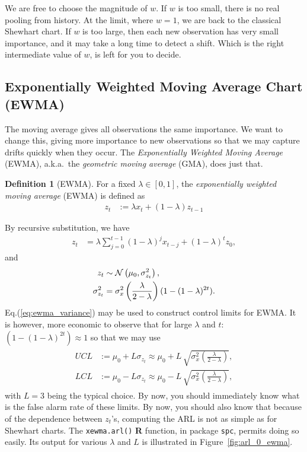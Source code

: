 \documentclass[12pt,a4paper]{report}
\theoremstyle{plain}
\theoremstyle{definition}
\newtheorem{definition}{Definition}
\newcommand{\R}{\textnormal{\sffamily\bfseries R }}
\newcommand{\aka}{{a.k.a.\ }}
\newcommand{\rcode}[1]{\texttt{#1}}
\newcommand{\arm}{L}
\begin{document}
We are free to choose the magnitude of $w$. 
If $w$ is too small, there is no real pooling from history. At the limit, where $w=1$, we are back to the classical Shewhart chart. 
If $w$ is too large, then each new observation has very small importance, and it may take a long time to detect a shift.
Which is the right intermediate value of $w$, is left for you to decide.






\subsection{Exponentially Weighted Moving Average Chart (EWMA)}
The moving average gives all observations the same importance. 
We want to change this, giving more importance to new observations so that we may capture drifts quickly when they occur. 
The \emph{Exponentially Weighted Moving Average} (EWMA), \aka the \emph{geometric moving average} (GMA), does just that. 
\begin{definition}[EWMA]
For a fixed $\lambda \in [0,1]$, the \emph{exponentially weighted moving average} (EWMA) is defined as 
\begin{align}
	z_t &:= \lambda x_t + (1-\lambda) z_{t-1}
\end{align}
\end{definition}
By recursive substitution, we have 
\begin{align}
	z_t &= \lambda \sum_{j=0}^{t-1} (1-\lambda)^j x_{t-j} + (1-\lambda)^t z_0,
\end{align}
and 
\begin{align}
\label{eq:ewma_variance}
	z_t &\sim \mathcal{N}\left(\mu_0,	\sigma^2_{z_t} \right), \\
	\sigma^2_{z_t} &= \sigma^2_x \left( \frac{\lambda}{2-\lambda} \right)(1-(1-\lambda)^{2t}).
\end{align}
Eq.(\ref{eq:ewma_variance}) may be used to construct control limits for EWMA.
It is however, more economic to observe that for large $\lambda$ and $t$: $(1-(1-\lambda)^{2t}) \approx 1$ so that we may use 
\begin{align}
\begin{split}
\label{eq:ewma_variance_approximate}
	UCL &:= \mu_0 + \arm \sigma_{z_t} \approx \mu_0 + \arm \, \sqrt{\sigma^2_x\left( \frac{\lambda}{2-\lambda} \right)},  \\
	LCL &:= \mu_0 - \arm \sigma_{z_t} \approx \mu_0 - \arm \, \sqrt{\sigma^2_x\left( \frac{\lambda}{2-\lambda} \right)},
\end{split}
\end{align}
with $\arm=3$ being the typical choice.
By now, you should immediately know what is the false alarm rate of these limits.
By now, you should also know that because of the dependence between $z_t$'s, computing the ARL is not as simple as for Shewhart charts. The \rcode{xewma.arl()} \R function, in package \rcode{spc}, permits doing so easily. 
Its output for various $\lambda$ and $\arm$ is illustrated in Figure~\ref{fig:arl_0_ewma}.
\end{document}
